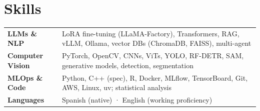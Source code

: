 \documentclass[a4paper,11pt]{article}
\begin{document}
\section{Skills}
\small
\begin{tabularx}{\textwidth}{@{}p{1.21in}>{\raggedright\arraybackslash}X@{}}
  \textbf{LLMs \& NLP} & LoRA fine-tuning (LLaMA-Factory), Transformers, RAG, vLLM, Ollama, vector DBs (ChromaDB, FAISS), multi-agent \\
  \textbf{Computer Vision} & PyTorch, OpenCV, CNNs, ViTs, YOLO, RF-DETR, SAM, generative models, detection, segmentation \\
  \textbf{MLOps \& Code} & Python, C++ (spec), R, Docker, MLflow, TensorBoard, Git, AWS, Linux, uv; statistical analysis \\
  \textbf{Languages} & Spanish (native) · English (working proficiency) \\
\end{tabularx}
\end{document}
